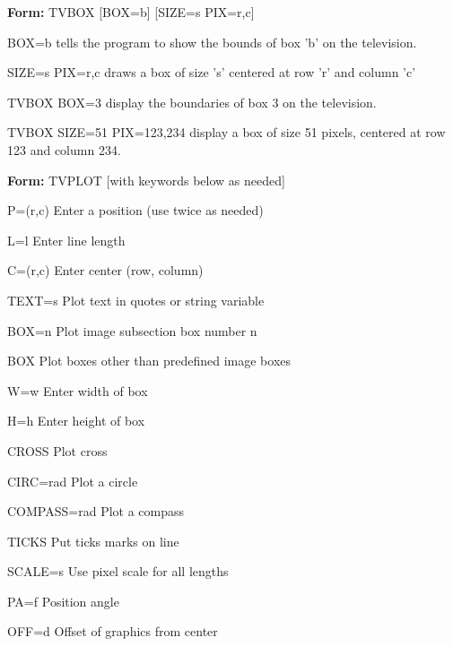 {\newpage\clearpage
{}%
\begin{command}
  \item[\textbf{Form: } TVBOX {[BOX=b]} {[SIZE=s PIX=r,c]}\hfill]{}
  \item[BOX=b]{tells the program to show the bounds
       of box 'b' on the television.}
  \item[SIZE=s PIX=r,c]{draws a box of size 's' centered at row 
       'r' and column 'c'}
\end{command}%
\lthtmlfigureZ
\lthtmlcheckvsize\clearpage}

{\newpage\clearpage
{}%
\begin{example}
  \item[TVBOX BOX=3\hfill]{display the boundaries of box 3
       on the television.}
  \item[TVBOX SIZE=51 PIX=123,234\hfill]{display a box of size 51
       pixels, centered at row 123 and column 234.}
\end{example}%
\lthtmlfigureZ
\lthtmlcheckvsize\clearpage}

{\newpage\clearpage
{}%
\begin{command}
  \item[\textbf{Form: }TVPLOT {[with keywords below as needed]}\hfill]{}
  \item[P=(r,c)]{         Enter a position (use twice as needed)}
  \item[L=l]{             Enter line length}
  \item[C=(r,c)]{         Enter center (row, column)}
  \item[TEXT=s]{          Plot text in quotes or string variable}
  \item[BOX=n]{           Plot image subsection box number n}
  \item[BOX]{             Plot boxes other than predefined image boxes}
  \item[W=w]{             Enter width of box}
  \item[H=h]{             Enter height of box}
  \item[CROSS]{           Plot cross}
  \item[CIRC=rad]{        Plot a circle}
  \item[COMPASS=rad]{     Plot a compass}
  \item[TICKS]{           Put ticks marks on line}
  \item[SCALE=s]{         Use pixel scale for all lengths}
  \item[PA=f]{            Position angle}
  \item[OFF=d]{           Offset of graphics from center}
\end{command}%
\lthtmlfigureZ
\lthtmlcheckvsize\clearpage}

